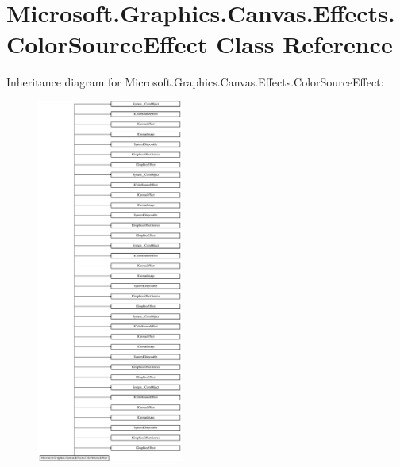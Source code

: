 \hypertarget{class_microsoft_1_1_graphics_1_1_canvas_1_1_effects_1_1_color_source_effect}{}\section{Microsoft.\+Graphics.\+Canvas.\+Effects.\+Color\+Source\+Effect Class Reference}
\label{class_microsoft_1_1_graphics_1_1_canvas_1_1_effects_1_1_color_source_effect}
Inheritance diagram for Microsoft.\+Graphics.\+Canvas.\+Effects.\+Color\+Source\+Effect\+:\begin{figure}[H]
\begin{center}
\leavevmode
\includegraphics[height=12.000000cm]{class_microsoft_1_1_graphics_1_1_canvas_1_1_effects_1_1_color_source_effect}
\end{center}
\end{figure}
